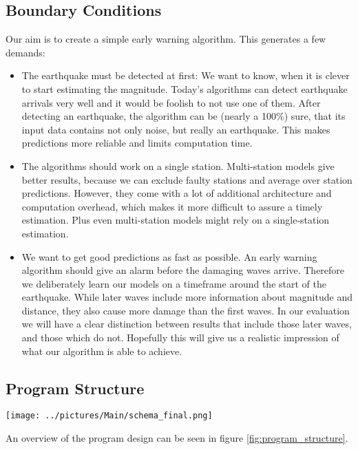 \documentclass[thesis.tex]{subfiles}
\begin{document}
\subsection{Boundary Conditions}
Our aim is to create a simple early warning algorithm. This generates a few demands:
\begin{itemize}
	\item The earthquake must be detected at first: We want to know, when it is clever to start estimating the magnitude. Today's algorithms can detect earthquake arrivals very well and it would be foolish to not use one of them. After detecting an earthquake, the algorithm can be (nearly a 100\%) sure, that its input data contains not only noise, but really an earthquake. This makes predictions more reliable and limits computation time. 
	\item The algorithms should work on a single station. Multi-station models give better results, because we can exclude faulty stations and average over station predictions. However, they come with a lot of additional architecture and computation overhead, which makes it more difficult to assure a timely estimation. Plus even multi-station models might rely on a single-station estimation. 
	\item We want to get good predictions as fast as possible. An early warning algorithm should give an alarm before the damaging waves arrive. Therefore we deliberately learn our models on a timeframe around the start of the earthquake. While later waves include more information about magnitude and distance, they also cause more damage than the first waves. In our evaluation we will have a clear distinction between results that include those later waves, and those which do not. Hopefully this will give us a realistic impression of what our algorithm is able to achieve.
\end{itemize}
\subsection{Program Structure}
\begin{figure*}[h!]
	\centering
	\texttt{[image: ../pictures/Main/schema\_final.png]}
	\caption{Overview of the program design. Preprocessing steps are not shown. Neural networks are shown in rounded rectangles, the proposed algorithm in orange, the baseline in green.}
	\label{fig:program_structure}
\end{figure*} 
An overview of the program design can be seen in figure \ref{fig:program_structure}. 
\end{document}
